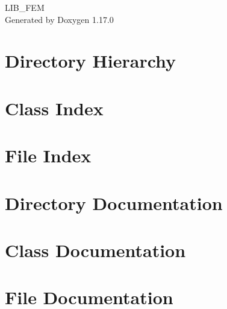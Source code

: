 \documentclass[twoside]{book}
\newcommand{\+}{\discretionary{\mbox{\scriptsize$\hookleftarrow$}}{}{}}
\newcommand{\clearemptydoublepage}{%
    \newpage{\pagestyle{empty}\cleardoublepage}%
  }
\begin{document}
  \raggedbottom
    \hypersetup{pageanchor=false,
                bookmarksnumbered=true,
                pdfencoding=unicode
               }
  \begin{titlepage}
  \vspace*{7cm}
  \begin{center}%
  {\Large LIB\+\_\+\+FEM}\\
  \vspace*{1cm}
  {\large Generated by Doxygen 1.17.0}\\
  \end{center}
  \end{titlepage}
  \clearemptydoublepage
  \tableofcontents
  \clearemptydoublepage
  \hypersetup{pageanchor=true}
\chapter{Directory Hierarchy}

\chapter{Class Index}

\chapter{File Index}

\chapter{Directory Documentation}


\chapter{Class Documentation}



\chapter{File Documentation}


















  \backmatter
  \newpage
  \clearemptydoublepage
  \printindex
\end{document}
